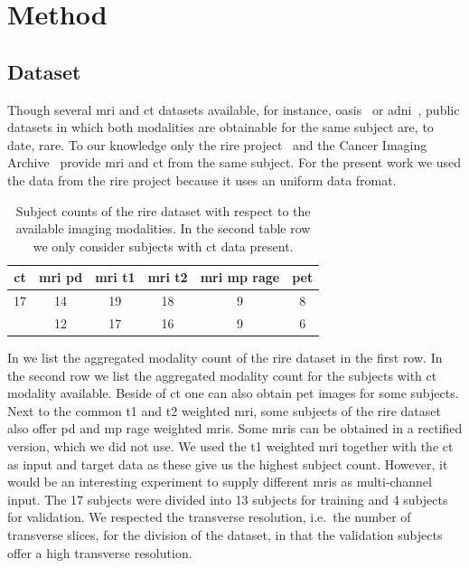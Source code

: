 \section{Method}

\subsection{Dataset}

Though several \gls{mri} and \gls{ct} datasets available, for instance,
\gls{oasis}~\cite{OASIS} or \gls{adni}~\cite{ADNI}, public datasets in which
both modalities are obtainable for the same subject are, to date, rare. To our
knowledge only the \gls{rire} project~\cite{RIRE} and the Cancer Imaging
Archive~\cite{CIA} provide \gls{mri} and \gls{ct} from the same subject. For
the present work we used the data from the \gls{rire} project because it uses
an uniform data fromat.
\begin{table}[h]
  \centering
  \begin{tabular}{*{6}{c}}
    \toprule
    \acrshort{ct} &
		\acrshort{mri} \acrshort{pd} &
		\acrshort{mri} \acrshort{t1} &
		\acrshort{mri} \acrshort{t2} &
		\acrshort{mri} \acrshort{mp} \acrshort{rage} &
		\acrshort{pet} \\
    \midrule
    \num{17} & \num{14} & \num{19} & \num{18} & \num{9} & \num{8} \\
             & \num{12} & \num{17} & \num{16} & \num{9} & \num{6} \\
    \bottomrule
  \end{tabular}
  \caption{Subject counts of the \gls{rire} dataset with respect to the
    available imaging modalities. In the second table row we only consider
    subjects with \gls{ct} data present.
  }\label{tab:rire}
\end{table}
In  we list the aggregated modality count of the \gls{rire}
dataset in the first row. In the second row we list the aggregated modality
count for the subjects with \gls{ct} modality available. Beside of \gls{ct}
one can also obtain \gls{pet} images for some subjects. Next to the common
\gls{t1} and \gls{t2} weighted \gls{mri}, some subjects of the \gls{rire}
dataset also offer \gls{pd} and \gls{mp} \gls{rage} weighted \gls{mri}s. Some
\gls{mri}s can be obtained in a rectified version, which we did not use. We
used the \gls{t1} weighted \gls{mri} together with the \gls{ct} as input and
target data as these give us the highest subject count. However, it would be
an interesting experiment to supply different \gls{mri}s as multi-channel
input. The \num{17} subjects were divided into \gls{13} subjects for training
and \gls{4} subjects for validation. We respected the transverse resolution,
i.e.\ the number of transverse slices, for the division of the dataset, in
that the validation subjects offer a high transverse resolution.

